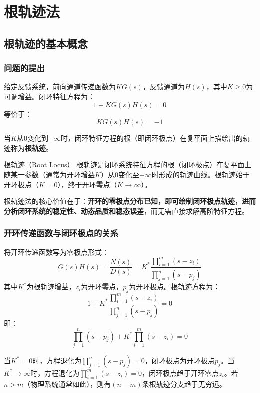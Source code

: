 \chapter{根轨迹法}


\section{根轨迹的基本概念}

\subsection{问题的提出}

给定反馈系统，前向通道传递函数为$KG(s)$，反馈通道为$H(s)$，其中$K \geq 0$为可调增益。闭环特征方程为：
\[
1 + KG(s)H(s) = 0
\]
等价于：
\[
KG(s)H(s) = -1
\]

当$K$从$0$变化到$+\infty$时，闭环特征方程的根（即闭环极点）在复平面上描绘出的轨迹称为\textbf{根轨迹}。

\begin{mydefinition}{根轨迹（Root Locus）}
根轨迹是闭环系统特征方程的根（闭环极点）在复平面上随某一参数（通常为开环增益$K$）从$0$变化至$+\infty$时形成的轨迹曲线。根轨迹始于开环极点（$K=0$），终于开环零点（$K\to\infty$）。
\end{mydefinition}

根轨迹法的核心价值在于：\textbf{开环的零极点分布已知，即可绘制闭环极点轨迹，进而分析闭环系统的稳定性、动态品质和稳态误差}，而无需直接求解高阶特征方程。

\subsection{开环传递函数与闭环极点的关系}

将开环传递函数写为零极点形式：
\[
G(s)H(s) = \frac{N(s)}{D(s)} = K^* \frac{\prod_{i=1}^{m} (s-z_i)}{\prod_{j=1}^{n} (s-p_j)}
\]
其中$K^*$为根轨迹增益，$z_i$为开环零点，$p_j$为开环极点。根轨迹方程为：
\[
1 + K^* \frac{\prod_{i=1}^{m} (s-z_i)}{\prod_{j=1}^{n} (s-p_j)} = 0
\]
即：
\[
\prod_{j=1}^{n} (s-p_j) + K^* \prod_{i=1}^{m} (s-z_i) = 0
\]

当$K^* = 0$时，方程退化为$\prod_{j=1}^{n} (s-p_j) = 0$，闭环极点为开环极点$p_j$。当$K^* \to \infty$时，方程退化为$\prod_{i=1}^{m} (s-z_i) = 0$，闭环极点趋于开环零点$z_i$。若$n > m$（物理系统通常如此），则有$(n-m)$条根轨迹分支趋于无穷远。

